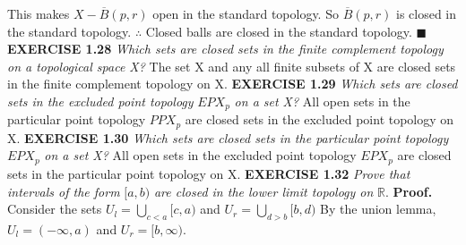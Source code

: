 \documentclass[12pt]{article}
\begin{document}
	\newline
	This makes \(X - \overline{B}(p, r)\) open in the standard topology.
	\newline
	So \(\overline{B}(p, r)\) is closed in the standard topology.
	\newline \newline
	\(\therefore\) Closed balls are closed in the standard topology. \newline \(\blacksquare\)
	\newpage
	\noindent
	\textbf{EXERCISE 1.28} \textit{Which sets are closed sets in the finite complement topology on a topological space X?}
	\newline \newline
	The set X and any all finite subsets of X are closed sets in the finite complement topology on X.
	\newline \newline \newline \newline \newline \newline
	\textbf{EXERCISE 1.29} \textit{Which sets are closed sets in the excluded point topology} \(EPX_p\) \textit{on a set X?}
	\newline \newline
	All open sets in the particular point topology \(PPX_p\) are closed sets in the excluded point topology on X.
	\newline \newline \newline \newline \newline \newline
	\textbf{EXERCISE 1.30} \textit{Which sets are closed sets in the particular point topology} \(EPX_p\) \textit{on a set X?}
	\newline \newline
	All open sets in the excluded point topology \(EPX_p\) are closed sets in the particular point topology on X.
	\newpage
	\noindent
	\textbf{EXERCISE 1.32} \textit{Prove that intervals of the form} \([a,b)\) \textit{are closed in the lower limit topology on} \(\mathbb{R}\).
	\newline \newline
	\textbf{Proof.} \newline
	Consider the sets \(U_l = \bigcup_{c < a}[c,a)\) and \(U_r = \bigcup_{d > b}[b,d)\) \newline
	By the union lemma, \(U_l = (-\infty, a)\) and \(U_r = [b, \infty)\). \newline \newline
\end{document}
